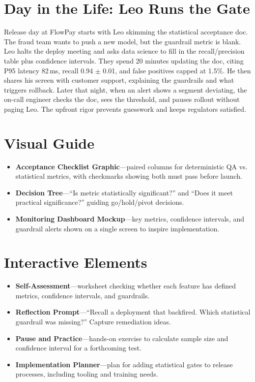 \section{Day in the Life: Leo Runs the Gate}
Release day at FlowPay starts with Leo skimming the statistical acceptance doc. The fraud team wants to push a new model, but the guardrail metric is blank. Leo halts the deploy meeting and asks data science to fill in the recall/precision table plus confidence intervals. They spend 20 minutes updating the doc, citing P95 latency 82\,ms, recall 0.94 $\pm$ 0.01, and false positives capped at 1.5\%. He then shares his screen with customer support, explaining the guardrails and what triggers rollback. Later that night, when an alert shows a segment deviating, the on-call engineer checks the doc, sees the threshold, and pauses rollout without paging Leo. The upfront rigor prevents guesswork and keeps regulators satisfied.

\section{Visual Guide}
\label{sec:stats-visuals}
\begin{itemize}
    \item \textbf{Acceptance Checklist Graphic}—paired columns for deterministic QA vs. statistical metrics, with checkmarks showing both must pass before launch.
    \item \textbf{Decision Tree}—``Is metric statistically significant?'' and ``Does it meet practical significance?'' guiding go/hold/pivot decisions.
    \item \textbf{Monitoring Dashboard Mockup}—key metrics, confidence intervals, and guardrail alerts shown on a single screen to inspire implementation.
\end{itemize}

\section{Interactive Elements}
\label{sec:stats-interactive}
\begin{itemize}
    \item \textbf{Self-Assessment}—worksheet checking whether each feature has defined metrics, confidence intervals, and guardrails.
    \item \textbf{Reflection Prompt}—``Recall a deployment that backfired. Which statistical guardrail was missing?'' Capture remediation ideas.
    \item \textbf{Pause and Practice}—hands-on exercise to calculate sample size and confidence interval for a forthcoming test.
    \item \textbf{Implementation Planner}—plan for adding statistical gates to release processes, including tooling and training needs.
\end{itemize}

